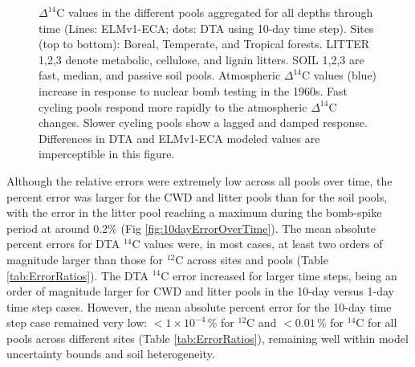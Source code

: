 \documentclass[draft]{agujournal2019}
\begin{document}
\begin{figure}[htbp]
        \vspace{-4em}
        \caption{$\Delta^{14}$C values in the different pools aggregated for all depths through time (Lines: ELMv1-ECA; dots: DTA using 10-day time step). Sites (top to bottom): Boreal, Temperate, and Tropical forests. LITTER 1,2,3 denote metabolic, cellulose, and lignin litters. SOIL 1,2,3 are fast, median, and passive soil pools. Atmospheric $\Delta^{14}$C values (blue) increase in response to nuclear bomb testing in the 1960s. Fast cycling pools respond more rapidly to the atmospheric $\Delta^{14}$C changes. Slower cycling pools show a lagged and damped response. Differences in DTA and ELMv1-ECA modeled values are imperceptible in this figure.
        \label{fig:poolsOverTime}
        }
    \end{figure}    
    
    

Although the relative errors were extremely low across all pools over time, the percent error was larger for the CWD and litter pools than for the soil pools, with the error in the litter pool reaching a maximum during the  bomb-spike period at around 0.2\% (Fig \ref{fig:10dayErrorOverTime}). The mean absolute percent errors for DTA $^{14}$C values were, in most cases, at least two orders of magnitude larger than those for $^{12}$C across sites and pools (Table \ref{tab:ErrorRatios}). The DTA $^{14}$C error increased for larger time steps, being an order of magnitude larger for CWD and litter pools in the 10-day versus 1-day time step cases. However, the mean absolute percent error for the 10-day time step case remained very low: $< 1 \times 10^{-4}\,\%$ for $^{12}$C and $<0.01\,\%$ for $^{14}$C for all pools across different sites (Table \ref{tab:ErrorRatios}), remaining well within model uncertainty bounds and soil heterogeneity.
\end{document}

